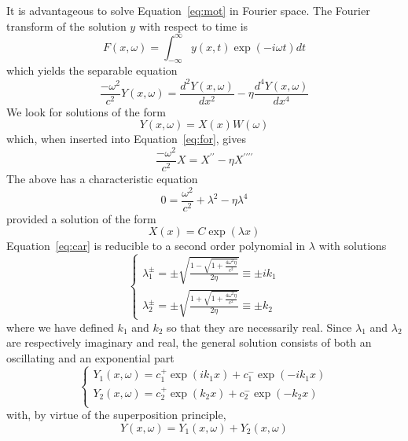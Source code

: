 \documentclass[twoside]{article}
\begin{document}
\begin{multicols}{2}
It is advantageous to solve Equation~\ref{eq:mot} in Fourier space. The Fourier transform of the solution $y$ with respect to time is
\begin{equation}
	F(x,\omega) = \int_{-\infty}^{\infty} y(x,t)\exp(-i \omega t)dt
\end{equation}
which yields the separable equation
\begin{equation}
\frac{- \omega^2}{c^2}  Y(x,\omega) = \frac{d^2Y(x,\omega)}{dx^2} - \eta \frac{d^4Y(x,\omega)}{dx^4}
	\label{eq:for}
\end{equation}
 We look for solutions of the form
\begin{equation}
	Y(x,\omega) = X(x)W(\omega)
\end{equation}
which, when inserted into Equation~\ref{eq:for}, gives
\begin{equation}
\frac{- \omega^2}{c^2}  X = X^{\prime\prime} - \eta X^{\prime\prime \prime \prime}
\end{equation}
The above has a characteristic equation
\begin{equation}
0 = \frac{ \omega^2}{c^2}   + \lambda^2 - \eta \lambda^4
\label{eq:car}
\end{equation}
provided  a solution of the form
\begin{equation}
	X(x) = C\exp(\lambda x)
\end{equation}
Equation~\ref{eq:car} is reducible to a second order polynomial in $\lambda$ with solutions 
\begin{equation}
	\begin{cases}
	\lambda^\pm_1 = \pm  \sqrt{\frac{1 - \sqrt{1 + \frac{4\omega^2 \eta }{c^2}  }  }{2\eta }} \equiv \pm ik_1 \\ 
	\lambda^\pm_2 = \pm  \sqrt{\frac{1 + \sqrt{1 + \frac{4\omega^2 \eta }{c^2}  }  }{2\eta }} \equiv \pm k_2
	\end{cases} 
		\label{eq:lambdas}
\end{equation}
where we have defined $k_1$ and $k_2$ so that they are necessarily real. Since $\lambda_1$ and $\lambda_2$ are respectively imaginary and real, the general solution consists of both an oscillating and an exponential part 
\begin{equation}
\begin{cases}
Y_1(x,\omega) = c^+_1 \exp(ik_1 x) + c^-_1 \exp(-ik_1 x)  \\ 
Y_2(x,\omega) = c^+_2 \exp(k_2 x) + c^-_2 \exp(-k_2 x) \\
\end{cases} 
\label{eq:gensol}
\end{equation}
with, by virtue of the superposition principle, 
\begin{equation}
	Y(x,\omega) = Y_1(x,\omega) +  Y_2(x,\omega) 
\end{equation}


\end{multicols}
\end{document}
